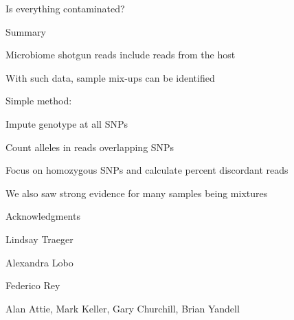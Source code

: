 \documentclass[aspectratio=169,12pt,t]{beamer}
\begin{document}
\begin{frame}[c]{Is everything contaminated?}


\note{
}

\end{frame}




\begin{frame}[c]{Summary}

\bbi
 \item Microbiome shotgun reads include reads from the host
 \item With such data, sample mix-ups can be identified
 \item Simple method:
   \bi
 \item Impute genotype at all SNPs
 \item Count alleles in reads overlapping SNPs
 \item Focus on homozygous SNPs and calculate percent discordant reads
   \ei
 \item We also saw strong evidence for many samples being mixtures
\ei

\note{
}

\end{frame}




\begin{frame}[c]{Acknowledgments}

\bbi
 \item Lindsay Traeger
 \item Alexandra Lobo
 \item Federico Rey
 \item Alan Attie, Mark Keller, Gary Churchill, Brian Yandell
\ei


\end{frame}
\end{document}
